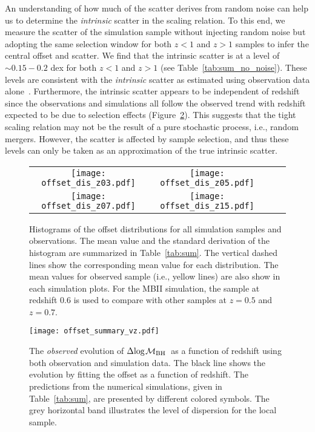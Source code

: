\documentclass[twocolumn]{aastex631}
\def\mbh{$\mathcal M_{\rm BH}$}
\begin{document}
An understanding of how much of the scatter derives from random noise can help us to determine the {\it intrinsic} scatter in the scaling relation. To this end, we measure the scatter of the simulation sample without injecting random noise but adopting the same selection window for both $z<1$ and $z>1$ samples to infer the central offset and scatter. We find that the intrinsic scatter is at a level of $\sim0.15-0.2$ dex for both $z<1$ and $z>1$ (see Table~\ref{tab:sum_no_noise}). These levels are consistent with the {\it intrinsic} scatter as estimated using observation data alone~\citep{Ding2020, 2021arXiv210902751L}. Furthermore, the intrinsic scatter appears to be independent of redshift since the observations and simulations all follow the observed trend with redshift expected to be due to selection effects (Figure~\ref{fig:offsets_vz}). This suggests that the tight scaling relation may not be the result of a pure stochastic process, i.e., random mergers. However, the scatter is affected by sample selection, and thus these levels can only be taken as an approximation of the true intrinsic scatter.

\begin{figure}
\centering
\begin{tabular}{c c c c}
\hspace*{-0.4cm} 
{\texttt{[image: offset\_dis\_z03.pdf]}}&
\hspace*{-0.4cm} 
{\texttt{[image: offset\_dis\_z05.pdf]}}\\
\hspace*{-0.4cm} 
{\texttt{[image: offset\_dis\_z07.pdf]}}&
\hspace*{-0.4cm} 
{\texttt{[image: offset\_dis\_z15.pdf]}}\\
\end{tabular}
\caption{\label{fig:offsets} 
Histograms of the offset distributions for all simulation samples and observations. The mean value and the standard derivation of the histogram are summarized in Table~\ref{tab:sum}. The vertical dashed lines show the corresponding mean value for each distribution. The mean values for observed sample (i.e., yellow lines) are also show in each simulation plots.
For the MBII simulation, the sample at redshift 0.6 is used to compare with other samples at $z=0.5$ and $z=0.7$.
}
\end{figure} 


\begin{figure}
\centering
\texttt{[image: offset\_summary\_vz.pdf]}
\caption{\label{fig:offsets_vz} 
The {\it observed} evolution of $\Delta{\rm log}$\mbh\ as a function of redshift using both observation and simulation data. The black line shows the evolution by fitting the offset as a function of redshift. The predictions from the numerical simulations, given in Table~\ref{tab:sum}, are presented by different colored symbols. The grey horizontal band illustrates the level of dispersion for the local sample.
}
\end{figure} 
\end{document}
